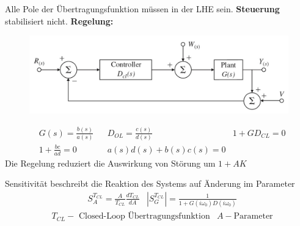 \begin{tcolorbox}[colback=white!10!white,colframe=green!30!black,title=Stabilität] 
Alle Pole der Übertragungsfunktion müssen in der LHE sein. \textbf{Steuerung} stabilisiert nicht. 
\textbf{Regelung:}

    \begin{figure}[H]
        \centering
        \includegraphics[width=.7\textwidth]{content/img/regler}
\end{figure}
    \begin{align*}
    &G(s) = \frac{b(s)}{a(s)}  && D_{OL} = \frac{c(s)}{d(s)}
    &1+ G D_{CL} = 0\\ 
    &1 + \frac{bc}{ad} = 0  &&
    a(s)d(s) + b(s)c(s) = 0 
    \end{align*}
Die Regelung reduziert die Auswirkung von Störung um $1+ AK$

\end{tcolorbox}

\begin{tcolorbox}[colback=white!10!white,colframe=green!30!black,title=Sensitivität] 
    Sensitivität beschreibt die Reaktion des Systems auf Änderung im Parameter
    \begin{align*}
        & S_{A}^{T_{CL}} = \frac{A}{T_{CL}}\frac{d T_{CL}}{dA}
        & |S_{G}^{T_{CL}}| = \frac{1}{1+G(i\omega_0)D(i\omega_0)}
        \end{align*}
    \begin{align*}
        &T_{CL} -\text{ Closed-Loop Übertragungsfunktion} & A - \text{Parameter}
    \end{align*}
\end{tcolorbox}





